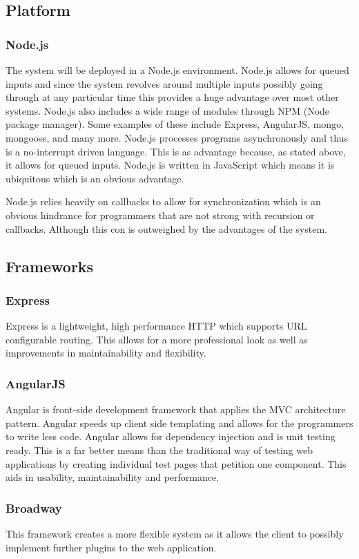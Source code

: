 \subsection{Platform}
\subsubsection{Node.js}
The system will be deployed in a Node.js environment. Node.js allows for queued inputs and since the system revolves around multiple inputs possibly going through at any particular time this provides a huge advantage over most other systems. Node.js also includes a wide range of modules through NPM (Node package manager). Some examples of these include Express, AngularJS, mongo, mongoose, and many more. Node.js processes programs asynchronously and thus is a no-interrupt driven language. This is as advantage because, as stated above, it allows for queued inputs. Node.js is written in JavaScript which means it is ubiquitous which is an obvious advantage.

Node.js relies heavily on callbacks to allow for synchronization which is an obvious hindrance for programmers that are not strong with recursion or callbacks. Although this con is outweighed by the advantages of the system.

\subsection{Frameworks}
\subsubsection{Express}
Express is a lightweight, high performance HTTP which supports URL configurable routing. This allows for a more professional look as well as improvements in maintainability and flexibility.
\subsubsection{AngularJS}
Angular is front-side development framework that applies the MVC architecture pattern. Angular speeds up client side templating and allows for the programmers to write less code. Angular allows for dependency injection and is unit testing ready. This is a far better means than the traditional way of testing web applications by creating individual test pages that petition one component. This aids in usability, maintainability and performance.
\subsubsection{Broadway}
This framework creates a more flexible system as it allows the client to possibly implement further plugins to the web application.
